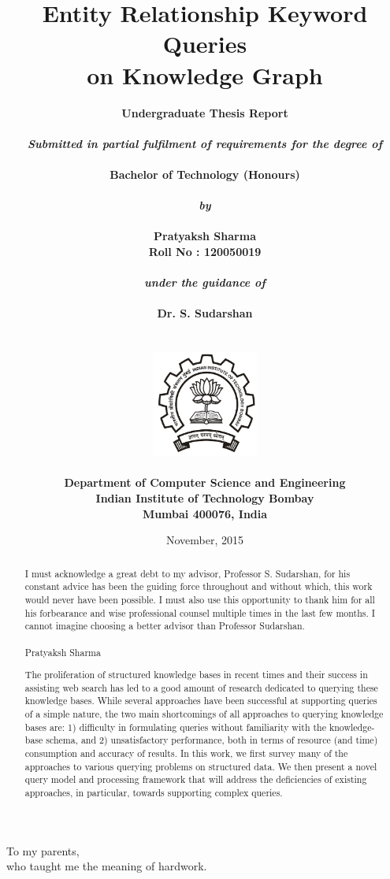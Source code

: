 \documentclass[a4paper, twoside, 12pt]{report}
\title{\textbf{Entity Relationship Keyword Queries \\ on Knowledge Graph}}
\author{
		\bf{Undergraduate Thesis Report}\\
        \\
        \emph{Submitted in partial fulfilment of requirements for the degree of}\\
        \\
        \bf{Bachelor of Technology (Honours)}\\
        \\
        \emph{by}\\
        \\
		\bf{Pratyaksh Sharma}\\
        \bf{Roll No : 120050019}\\
        \\
        \emph{under the guidance of}\\
        \\
		\bf{Dr. S. Sudarshan}\\
        \\\\
        \includegraphics[height=3.5cm]{iitb_logo.jpg}\\
        \\
		\bf{Department of Computer Science and Engineering}\\
        \bf{Indian Institute of Technology Bombay}\\
        \bf{Mumbai 400076, India}\\
}
\date{November, 2015}
\makeatletter
\newenvironment{dedication}
  {\clearpage           %
   \thispagestyle{empty}%
   \vspace*{\stretch{1}}%
   \itshape             %
   \center          %
  }
  {\par %
   \vspace{\stretch{3}} %
   \clearpage           %
}
\newcommand\frontmatter{%
    \cleardoublepage
  \pagenumbering{roman}}
\newcommand\mainmatter{%
    \cleardoublepage
  \pagenumbering{arabic}}
\makeatother
\begin{document}
\frontmatter

\maketitle

\linespread{1.2}

\setlength{\parindent}{2em}
\setlength{\parskip}{0.5em}


\begin{dedication}
To my parents,\\ who taught me the meaning of hardwork.
\end{dedication}


\renewcommand{\abstractname}{Acknowledgement}

\begin{abstract}

  I must acknowledge a great debt to my advisor, Professor S. Sudarshan, for his constant advice has been the guiding force throughout and without which, this work would never have been possible. I must also use this opportunity to thank him for all his forbearance and wise professional counsel multiple times in the last few months. I cannot imagine choosing a better advisor than Professor Sudarshan.
  \\ \\
Pratyaksh Sharma
\end{abstract}


\renewcommand{\abstractname}{Abstract}
\begin{abstract}
  The proliferation of structured knowledge bases in recent times and their success in assisting web search has led to a good amount of research dedicated to querying these knowledge bases. While several approaches have been successful at supporting queries of a simple nature, the two main shortcomings of all approaches to querying knowledge bases are: 1) difficulty in formulating queries without familiarity with the knowledge-base schema, and 2) unsatisfactory performance, both in terms of resource (and time) consumption and accuracy of results. In this work, we first survey many of the approaches to various querying problems on structured data. We then present a novel query model and processing framework that will address the deficiencies of existing approaches, in particular, towards supporting complex queries.

\end{abstract}


\tableofcontents

\mainmatter


\pagebreak














\end{document}
